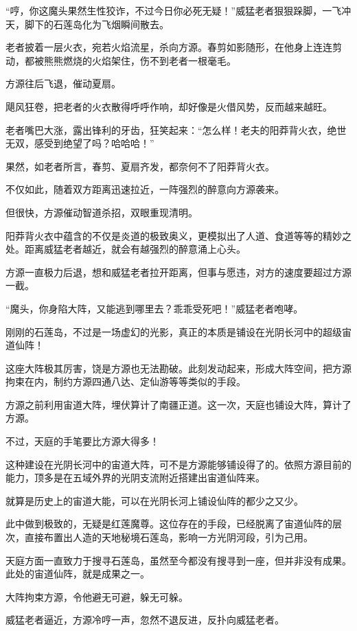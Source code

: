 \begin{this_body}
“哼，你这魔头果然生性狡诈，不过今日你必死无疑！”威猛老者狠狠跺脚，一飞冲天，脚下的石莲岛化为飞烟瞬间散去。

老者披着一层火衣，宛若火焰流星，杀向方源。春剪如影随形，在他身上连连剪动，都被熊熊燃烧的火焰架住，伤不到老者一根毫毛。

方源往后飞退，催动夏扇。

飓风狂卷，把老者的火衣散得呼呼作响，却好像是火借风势，反而越来越旺。

老者嘴巴大涨，露出锋利的牙齿，狂笑起来：“怎么样！老夫的阳莽背火衣，绝世无双，感受到绝望了吗？哈哈哈！”

果然，如老者所言，春剪、夏扇齐发，都奈何不了阳莽背火衣。

不仅如此，随着双方距离迅速拉近，一阵强烈的醉意向方源袭来。

但很快，方源催动智道杀招，双眼重现清明。

阳莽背火衣中蕴含的不仅是炎道的极致奥义，更模拟出了人道、食道等等的精妙之处。距离威猛老者越近，就会有越强烈的醉意涌上心头。

方源一直极力后退，想和威猛老者拉开距离，但事与愿违，对方的速度要超过方源一截。

“魔头，你身陷大阵，又能逃到哪里去？乖乖受死吧！”威猛老者咆哮。

刚刚的石莲岛，不过是一场虚幻的光影，真正的本质是铺设在光阴长河中的超级宙道仙阵！

这座大阵极其厉害，饶是方源也无法勘破。此刻发动起来，形成大阵空间，把方源拘束在内，制约方源四通八达、定仙游等等类似的手段。

方源之前利用宙道大阵，埋伏算计了南疆正道。这一次，天庭也铺设大阵，算计了方源。

不过，天庭的手笔要比方源大得多！

这种建设在光阴长河中的宙道大阵，可不是方源能够铺设得了的。依照方源目前的能力，顶多是在五域外界的光阴支流附近搭建出宙道仙阵来。

就算是历史上的宙道大能，可以在光阴长河上铺设仙阵的都少之又少。

此中做到极致的，无疑是红莲魔尊。这位存在的手段，已经脱离了宙道仙阵的层次，直接布置出人造的天地秘境石莲岛，影响一方光阴河段，引为己用。

天庭方面一直致力于搜寻石莲岛，虽然至今都没有搜寻到一座，但并非没有成果。此处的宙道仙阵，就是成果之一。

大阵拘束方源，令他避无可避，躲无可躲。

威猛老者逼近，方源冷哼一声，忽然不退反进，反扑向威猛老者。


\end{this_body}
